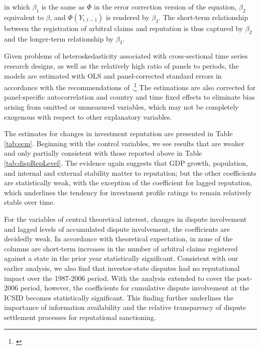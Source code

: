 \documentclass[12pt,onesided]{amsart}
\begin{document}
in which $\beta_{1}$ is the same as $\Phi$ in the error correction version of the equation, $\beta_{2}$ equivalent to $\beta$, and $\Phi(Y_{i,t-1})$ is rendered by $\beta_{3}$. The short-term relationship between the registration of arbitral claims and reputation is thus captured by $\beta_{2}$  and the longer-term relationship by $\beta_{3}$.

Given problems of heteroskedasticity associated with cross-sectional time series research designs, as well as the relatively high ratio of panels to periods, the models are estimated with OLS and panel-corrected standard errors in accordance with the recommendations of \citeauthor{beck:katz:1995}.\footnote{\citet{beck:katz:1995}} The estimations are also corrected for panel-specific autocorrelation and country and time fixed effects to eliminate bias arising from omitted or unmeasured variables, which may not be completely exogenous with respect to other explanatory variables.

The estimates for changes in investment reputation are presented in Table \ref{tab:ecm}. Beginning with the control variables, we see results that are weaker and only partially consistent with those reported above in Table \ref{tab:dispRepLevel}. The evidence again suggests that GDP growth, population, and internal and external stability matter to reputation; but the other coefficients are statistically weak, with the exception of the coefficient for lagged reputation, which underlines the tendency for investment profile ratings to remain relatively stable over time. 

For the variables of central theoretical interest, changes in dispute involvement and lagged levels of accumulated dispute involvement, the coefficients are decidedly weak. In accordance with theoretical expectation, in none of the columns are short-term increases in the number of arbitral claims registered against a state in the prior year statistically significant. Consistent with our earlier analysis, we also find that investor-state disputes had no reputational impact over the 1987-2006 period. With the analysis extended to cover the post-2006 period, however, the coefficients for cumulative dispute involvement at the ICSID becomes statistically significant. This finding further underlines the importance of information availability and the relative transparency of dispute settlement processes for reputational sanctioning. 
\end{document}
